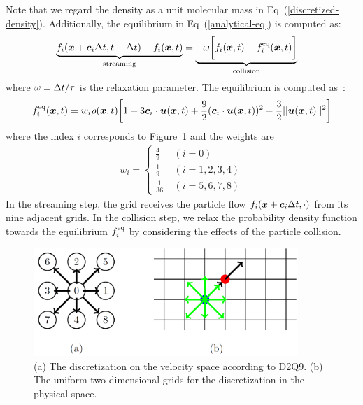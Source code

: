 Note that we regard the density as
a unit molecular mass in Eq~(\ref{discretized-density}).
Additionally, the equilibrium in Eq~(\ref{analytical-eq}) is computed as:
\begin{equation}
\begin{aligned}
  \underbrace{f_i(\boldsymbol{x} + \boldsymbol{c}_i\Delta t , t + \Delta t) - f_i(\boldsymbol{x}, t)}_{
    \text{streaming}
  } &= 
  \underbrace{- \omega 
  \biggl[
    f_i(\boldsymbol{x}, t) -
    f^{\rm eq}_i(\boldsymbol{x}, t)
  \biggl]}_{
    \text{collision}
  }
\end{aligned}
\label{discretized-streaming}
\end{equation}
where $\omega = \Delta t / \tau$ is the relaxation parameter.
The equilibrium is computed as~\cite{zhao2002non}:
\begin{equation}
\begin{aligned}
  f^{\rm eq}_i(\boldsymbol{x}, t) &=
  w_i \rho(\boldsymbol{x}, t) \biggl[
    1 + 3 \boldsymbol{c}_i \cdot \boldsymbol{u}(\boldsymbol{x}, t) +
    \frac{9}{2}(\boldsymbol{c}_i \cdot \boldsymbol{u}(\boldsymbol{x}, t))^2
    -\frac{3}{2} || \boldsymbol{u}(\boldsymbol{x}, t) ||^2
  \biggr] \\
\end{aligned}
\label{discretized-eq}
\end{equation}
where the index $i$ corresponds to Figure~\ref{fig:d2q9}
and the weights are 
\begin{eqnarray}
  w_i = \left\{
  \begin{array}{cl}
     \frac{4}{9}&~(i = 0) \\
     \frac{1}{9}&~(i=1,2,3,4) \\
     \frac{1}{36}&~(i=5,6,7,8)
  \end{array}
  \right.
\end{eqnarray}
In the streaming step, the grid receives 
the particle flow $f_i(\boldsymbol{x} + \boldsymbol{c}_i \Delta t, \cdot)$
from its nine adjacent grids.
In the collision step,
we relax the probability density function 
towards the equilibrium $f_i^{\rm eq}$
by considering the effects of the particle collision.

\begin{figure}[h!]
  \begin{center}
   \includegraphics[width=10cm]{logos/Gitter_LBM.png}
   \vspace{-3mm}
   \caption{
      (a) The discretization on the velocity space according to D2Q9.
      (b) The uniform two-dimensional grids for
      the discretization in the physical space.
   }
  \label{fig:d2q9}
  \end{center}
  \vspace{-3mm}
\end{figure}

